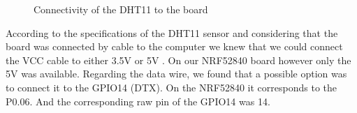 \begin{figure}[!ht]
    \caption{Connectivity of the DHT11 to the board}%
    \label{fig:connectionDHT11}%
\end{figure}
According to the specifications of the DHT11 sensor and considering that the board was connected by cable to the computer we knew that we could connect the VCC cable to either 3.5V or 5V \cite{b1}. On our NRF52840 board however only the 5V was available. 
Regarding the data wire, we found that a possible option was to connect it to the GPIO14 (DTX)\cite{b2}. On the NRF52840 it corresponds to the P0.06. And the corresponding raw pin of the GPIO14 was 14. 
